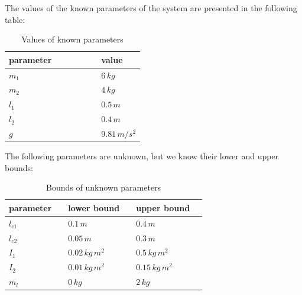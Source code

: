 \documentclass[a4paper]{article}
\begin{document}
\noindent\hspace{-2pt}
The values of the known parameters of the system are presented in the following table:
\begin{table}[H]
    \centering
    \begin{tabular}{lllllll}
        \hline
        \textbf{parameter} & & & & & & \textbf{value}              \\ \hline
        $m_1$              & & & & & & $6 \, kg$                        \\
        $m_2$              & & & & & & $4 \, kg$                        \\
        $l_1$              & & & & & & $0.5 \, m$                       \\
        $l_2$              & & & & & & $0.4 \, m$                       \\
        $g$                & & & & & & $9.81 \, m/s^2$ \\ \hline
    \end{tabular}
    \caption{Values of known parameters}
\end{table}

\noindent\hspace{-2pt}
The following parameters are unknown, but we know their lower and upper bounds:
\begin{table}[H]
    \centering
    \begin{tabular}{llllll}
        \hline
        \textbf{parameter} & & \textbf{lower bound} & & \textbf{upper bound}              \\ \hline
        $l_{c1}$               & &  $0.1 \, m$ & &                 $0.4 \, m$                        \\
        $l_{c2}$               & &  $0.05 \, m$ & &                $0.3 \, m$                        \\
        $I_1$               & &     $0.02 \, kg \, m^2$ & &    $0.5 \, kg \, m^2$                       \\
        $I_2$               & &     $0.01 \, kg \, m^2$ & &    $0.15 \,kg \, m^2$                       \\
        $m_l$                  & &  $0 \, kg$ & &                  $2 \, kg$ \\ \hline
    \end{tabular}
    \caption{Bounds of unknown parameters}
\end{table}
\end{document}
